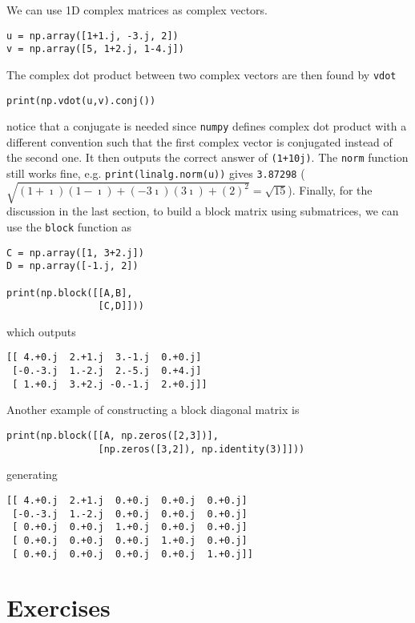 We can use 1D complex matrices as complex vectors.
\begin{lstlisting}
u = np.array([1+1.j, -3.j, 2])
v = np.array([5, 1+2.j, 1-4.j])    
\end{lstlisting}
The complex dot product between two complex vectors are then found by \verb|vdot|
\begin{lstlisting}
print(np.vdot(u,v).conj()) 
\end{lstlisting}
notice that a conjugate is needed since \verb|numpy| defines complex dot product with a different convention such that the first complex vector is conjugated instead of the second one. It then outputs the correct answer of \verb|(1+10j)|. The \verb|norm| function still works fine, e.g. \verb|print(linalg.norm(u))| gives \verb|3.87298| ($\sqrt{(1+\imath)(1-\imath) + (-3\imath)(3\imath) + (2)^2} = \sqrt{15}$). Finally, for the discussion in the last section, to build a block matrix using submatrices, we can use the \verb|block| function as
\begin{lstlisting}
C = np.array([1, 3+2.j])
D = np.array([-1.j, 2])

print(np.block([[A,B],
                [C,D]]))
\end{lstlisting}
which outputs
\begin{lstlisting}
[[ 4.+0.j  2.+1.j  3.-1.j  0.+0.j]
 [-0.-3.j  1.-2.j  2.-5.j  0.+4.j]
 [ 1.+0.j  3.+2.j -0.-1.j  2.+0.j]]    
\end{lstlisting}
Another example of constructing a block diagonal matrix is
\begin{lstlisting}
print(np.block([[A, np.zeros([2,3])],
                [np.zeros([3,2]), np.identity(3)]]))    
\end{lstlisting}
generating
\begin{lstlisting}
[[ 4.+0.j  2.+1.j  0.+0.j  0.+0.j  0.+0.j]
 [-0.-3.j  1.-2.j  0.+0.j  0.+0.j  0.+0.j]
 [ 0.+0.j  0.+0.j  1.+0.j  0.+0.j  0.+0.j]
 [ 0.+0.j  0.+0.j  0.+0.j  1.+0.j  0.+0.j]
 [ 0.+0.j  0.+0.j  0.+0.j  0.+0.j  1.+0.j]]    
\end{lstlisting}

\section{Exercises}

